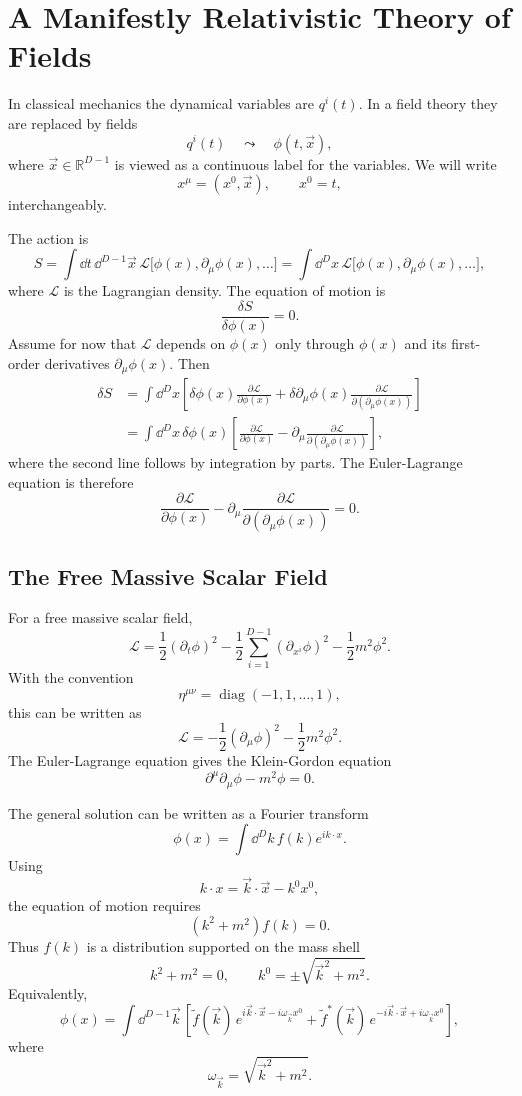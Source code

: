\section{A Manifestly Relativistic Theory of Fields}

In classical mechanics the dynamical variables are \(q^i(t)\). In a field
theory they are replaced by fields
\[
  q^i(t)\quad\leadsto\quad \phi(t,\vec x),
\]
where \(\vec x\in \mathbb R^{D-1}\) is viewed as a continuous label for the
variables. We will write
\[
  x^\mu=(x^0,\vec x),\qquad x^0=t,
\]
interchangeably.

The action is
\[
  S=\int \dd t\,\dd^{D-1}\vec x\,
  \mathcal L\bigl[\phi(x),\partial_\mu\phi(x),\ldots\bigr]
  =
  \int \dd^D x\,
  \mathcal L\bigl[\phi(x),\partial_\mu\phi(x),\ldots\bigr],
\]
where \(\mathcal L\) is the Lagrangian density. The equation of motion is
\[
  \frac{\delta S}{\delta\phi(x)}=0.
\]
Assume for now that \(\mathcal L\) depends on \(\phi(x)\) only through
\(\phi(x)\) and its first-order derivatives \(\partial_\mu\phi(x)\). Then
\[
\begin{aligned}
  \delta S
  &=
  \int\dd^D x\left[
    \delta\phi(x)\frac{\partial\mathcal L}{\partial\phi(x)}
    +\delta\partial_\mu\phi(x)
      \frac{\partial\mathcal L}{\partial(\partial_\mu\phi(x))}
  \right]\\
  &=
  \int\dd^D x\,\delta\phi(x)\left[
    \frac{\partial\mathcal L}{\partial\phi(x)}
    -\partial_\mu
      \frac{\partial\mathcal L}{\partial(\partial_\mu\phi(x))}
  \right],
\end{aligned}
\]
where the second line follows by integration by parts. The Euler-Lagrange
equation is therefore
\[
  \frac{\partial\mathcal L}{\partial\phi(x)}
  -\partial_\mu
   \frac{\partial\mathcal L}{\partial(\partial_\mu\phi(x))}
  =0 .
\]

\subsection{The Free Massive Scalar Field}

For a free massive scalar field,
\[
  \mathcal L
  =
  \frac12(\partial_t\phi)^2
  -\frac12\sum_{i=1}^{D-1}(\partial_{x^i}\phi)^2
  -\frac12m^2\phi^2 .
\]
With the convention
\[
  \eta^{\mu\nu}=\operatorname{diag}(-1,1,\ldots,1),
\]
this can be written as
\[
  \mathcal L
  =
  -\frac12(\partial_\mu\phi)^2-\frac12m^2\phi^2 .
\]
The Euler-Lagrange equation gives the Klein-Gordon equation
\[
  \partial^\mu\partial_\mu\phi-m^2\phi=0 .
\]

The general solution can be written as a Fourier transform
\[
  \phi(x)=\int \dd^D k\, f(k)e^{ik\cdot x}.
\]
Using
\[
  k\cdot x=\vec k\cdot\vec x-k^0x^0,
\]
the equation of motion requires
\[
  (k^2+m^2)f(k)=0.
\]
Thus \(f(k)\) is a distribution supported on the mass shell
\[
  k^2+m^2=0,
  \qquad
  k^0=\pm\sqrt{\vec k^2+m^2}.
\]
Equivalently,
\[
  \phi(x)
  =
  \int \dd^{D-1}\vec k\,
  \left[
    \widetilde f(\vec k)\,
      e^{i\vec k\cdot\vec x-i\omega_{\vec k}x^0}
    +
    \widetilde f^*(\vec k)\,
      e^{-i\vec k\cdot\vec x+i\omega_{\vec k}x^0}
  \right],
\]
where
\[
  \omega_{\vec k}=\sqrt{\vec k^2+m^2}.
\]

